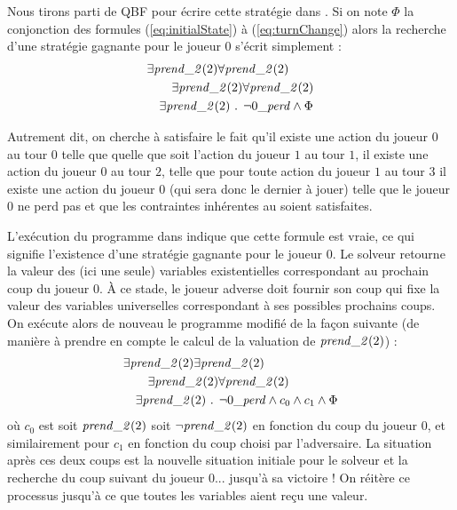 Nous tirons parti de QBF pour écrire cette stratégie dans \touist. Si on note $\Phi$ la conjonction des formules (\ref{eq:initialState}) à (\ref{eq:turnChange}) alors la recherche d'une stratégie gagnante pour le joueur $0$ s'écrit simplement :
\vspace{-0.2cm}
\begin{align}
\begin{split}
&\exists \takes{0}
\forall \takes{1}\\
&\qquad\exists \takes{2}
\forall \takes{3} \\
&\quad\exists \takes{4}\text{ . }\neg \lost \land \Phi
\end{split}
\end{align}

\noindent
Autrement dit, on cherche à satisfaire le fait qu'il existe une action du joueur $0$ au tour $0$ telle que quelle que soit l'action du joueur $1$ au tour $1$, il existe une action du joueur $0$ au tour $2$, telle que pour toute action du joueur $1$ au tour $3$ il existe une action du joueur $0$ (qui sera donc le dernier à jouer) telle que le joueur $0$ ne perd pas et que les contraintes inhérentes au \game soient satisfaites.


L'exécution du programme dans \touist indique que cette formule est vraie, ce qui signifie l'existence d'une stratégie gagnante pour le joueur $0$. Le solveur retourne la valeur des (ici une seule) variables existentielles correspondant au prochain coup du joueur $0$. À ce stade, le joueur adverse doit fournir son coup qui fixe la valeur des variables universelles correspondant à ses possibles prochains coups. On exécute alors de nouveau le programme modifié de la façon suivante (de manière à prendre en compte le calcul de la valuation de $\takes{0}$) :
\begin{align*}
\begin{split}
&\exists \takes{0}
\exists \takes{1}\\
&\qquad\exists \takes{2}
\forall \takes{3} \\
&\quad\exists \takes{4}\text{ . }\neg \lost \land c_0 \land c_1 \land  \Phi
\end{split}
\end{align*}
où $c_0$ est soit $\takes{0}$ soit $\neg \takes{0}$ en fonction du coup du joueur $0$, et similairement pour $c_1$ en fonction du coup choisi par l'adversaire. La  situation après ces deux coups est la nouvelle situation initiale pour le solveur et la recherche du coup suivant du joueur $0$... jusqu'à sa victoire ! On réitère ce processus jusqu'à ce que toutes les variables aient reçu une valeur. 
